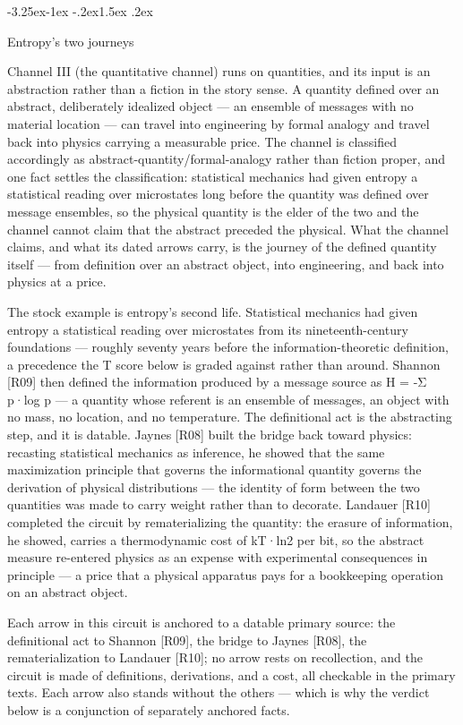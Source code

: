 \documentclass[11pt,a4paper]{article}
\makeatletter
\renewcommand\subsection{\@startsection{subsection}{2}{\z@}%
  {-3.25ex\@plus -1ex \@minus -.2ex}{1.5ex \@plus .2ex}%
  {\normalfont\large\bfseries\raggedright}}
\makeatother
\begin{document}
\subsection{Entropy's two journeys}

Channel III (the quantitative channel) runs on quantities, and its input is an abstraction rather than a fiction in the story sense. A quantity defined over an abstract, deliberately idealized object — an ensemble of messages with no material location — can travel into engineering by formal analogy and travel back into physics carrying a measurable price. The channel is classified accordingly as abstract-quantity/formal-analogy rather than fiction proper, and one fact settles the classification: statistical mechanics had given entropy a statistical reading over microstates long before the quantity was defined over message ensembles, so the physical quantity is the elder of the two and the channel cannot claim that the abstract preceded the physical. What the channel claims, and what its dated arrows carry, is the journey of the defined quantity itself — from definition over an abstract object, into engineering, and back into physics at a price.

The stock example is entropy's second life. Statistical mechanics had given entropy a statistical reading over microstates from its nineteenth-century foundations — roughly seventy years before the information-theoretic definition, a precedence the T score below is graded against rather than around. Shannon [R09] then defined the information produced by a message source as H = -Σ p·log p — a quantity whose referent is an ensemble of messages, an object with no mass, no location, and no temperature. The definitional act is the abstracting step, and it is datable. Jaynes [R08] built the bridge back toward physics: recasting statistical mechanics as inference, he showed that the same maximization principle that governs the informational quantity governs the derivation of physical distributions — the identity of form between the two quantities was made to carry weight rather than to decorate. Landauer [R10] completed the circuit by rematerializing the quantity: the erasure of information, he showed, carries a thermodynamic cost of kT·ln2 per bit, so the abstract measure re-entered physics as an expense with experimental consequences in principle — a price that a physical apparatus pays for a bookkeeping operation on an abstract object.

Each arrow in this circuit is anchored to a datable primary source: the definitional act to Shannon [R09], the bridge to Jaynes [R08], the rematerialization to Landauer [R10]; no arrow rests on recollection, and the circuit is made of definitions, derivations, and a cost, all checkable in the primary texts. Each arrow also stands without the others — which is why the verdict below is a conjunction of separately anchored facts.
\end{document}
